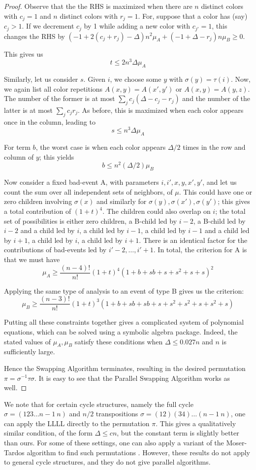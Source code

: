 \begin{proof}
Observe that the the RHS is maximized when there are $n$ distinct colors with $c_j = 1$ and $n$ distinct colors with $r_j = 1$. For, suppose that a color has (say) $c_j > 1$. If we decrement $c_j$ by 1 while adding a new color with $c_{j'} = 1$, this changes the RHS by $(-1 + 2 (c_j + r_j) - \Delta) n^2 \mu_A + (-1 + \Delta - r_j) n \mu_B \geq 0$.

This gives us 
$$
t \leq 2 n^3 \Delta \mu_A
$$

Similarly, let us consider $s$. Given $i$, we choose some $y$ with $\sigma(y) = \tau(i)$. Now, we again list all color repetitions $A(x,y) = A(x',y')$ or $A(x,y) = A(y,z)$. The number of the former is at most $\sum_j c_j (\Delta - c_j - r_j)$ and the number of the latter is at most $\sum_j c_j r_j$. As before, this is maximized when each color appears once in the column, leading to 
$$
s \leq n^3 \Delta \mu_A
$$

For term $b$, the worst case is when each color appears $\Delta/2$ times in the row and column of $y$; this yields
$$
b \leq n^2 (\Delta/2) \mu_B
$$

Now consider a fixed bad-event A, with parameters $i, i', x,y,x', y'$, and let us count the sum over all independent sets of neighbors, of $\mu$. This could have one or zero children involving $\sigma(x)$ and similarly for $\sigma(y),\sigma(x'), \sigma(y')$; this gives a total contribution of $(1+t)^4$. The children could also overlap on $i$; the total set of possibilities is either zero children, a B-child led by $i-2$, a B-child led by $i-2$ and a child led by $i$, a child led by $i-1$, a child led by $i-1$ and a child led by $i+1$, a child led by $i$, a child led by $i+1$. There is an identical factor for the contributions of bad-events led by $i'-2, \dots, i'+1$.  In total, the criterion for A is that we must have
$$
\mu_A \geq \frac{(n-4)!}{n!} (1+t)^4 (1 + b + s b + s + s^2 + s + s)^2
$$

Applying the same type of analysis to an event of type B gives us the criterion:
$$
\mu_B \geq \frac{(n-3)!}{n!} (1+t)^3 (1 + b + s b + s b+ s + s^2 + s^2 + s + s^2 + s)
$$

Putting all these constraints together gives a complicated system of polynomial equations, which can be solved using a symbolic algebra package. Indeed, the stated values of $\mu_A, \mu_B$ satisfy these conditions when $\Delta \leq 0.027n$ and $n$ is sufficiently large.

Hence the Swapping Algorithm terminates, resulting in the desired permutation $\pi = \sigma^{-1} \tau \sigma$. It is easy to see that the Parallel Swapping Algorithm works as well.
\end{proof}
We note that for certain cycle structures, namely the full cycle $\sigma = (1 2 3 \dots n-1 \ n)$ and $n/2$ transpositions $\sigma = (1 2) (3 4) \dots (n-1 \ n)$, one can apply the LLLL directly to the permutation $\pi$. This gives a qualitatively similar condition, of the form $\Delta \leq c n$, but the constant term is slightly better than ours. For some of these settings, one can also apply a variant of the Moser-Tardos algorithm to find such permutations \cite{achlioptas}. However, these results do not apply to general cycle structures, and they do not give parallel algorithms.


